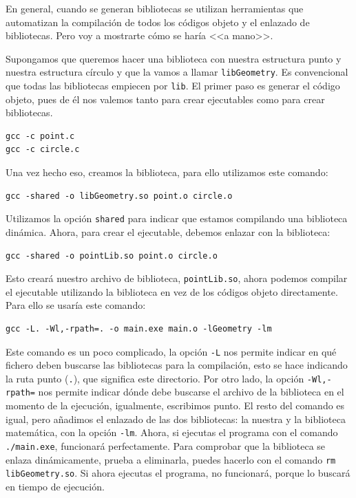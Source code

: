 \documentclass[a4paper]{article}
\begin{document}
En general, cuando se generan bibliotecas se utilizan herramientas que
automatizan la compilación de todos los códigos objeto y el enlazado de
bibliotecas. Pero voy a mostrarte cómo se haría <<a mano>>.

Supongamos que queremos hacer una biblioteca con nuestra estructura punto y
nuestra estructura círculo y que la vamos a llamar \verb!libGeometry!.
Es convencional que todas las bibliotecas empiecen por \verb!lib!.
El primer paso es generar el código objeto,
pues de él nos valemos tanto para crear ejecutables como para crear bibliotecas.
\begin{verbatim}
gcc -c point.c
gcc -c circle.c
\end{verbatim}

Una vez hecho eso, creamos la biblioteca, para ello utilizamos este comando:
\begin{verbatim}
gcc -shared -o libGeometry.so point.o circle.o
\end{verbatim}

Utilizamos la opción \verb!shared! para indicar que estamos compilando
una biblioteca dinámica. Ahora, para crear el ejecutable, debemos enlazar con
la biblioteca:

\begin{verbatim}
gcc -shared -o pointLib.so point.o circle.o
\end{verbatim}

Esto creará nuestro archivo de biblioteca, \verb!pointLib.so!, ahora podemos
compilar el ejecutable utilizando la biblioteca en vez de los códigos objeto
directamente. Para ello se usaría este comando:

\begin{verbatim}
gcc -L. -Wl,-rpath=. -o main.exe main.o -lGeometry -lm
\end{verbatim}

Este comando es un poco complicado, la opción \verb!-L! nos permite indicar
en qué fichero deben buscarse las bibliotecas para la compilación, esto se hace
indicando la ruta punto (\verb!.!), que significa este directorio. Por otro
lado, la opción \verb!-Wl,-rpath=! nos permite indicar dónde debe buscarse
el archivo de la biblioteca en el momento de la ejecución,
igualmente, escribimos punto. El resto del
comando es igual, pero añadimos el enlazado de las dos bibliotecas: la nuestra y
la biblioteca matemática, con la opción \verb!-lm!. Ahora, si ejecutas el
programa con el comando \verb!./main.exe!, funcionará perfectamente.
Para comprobar que la biblioteca se enlaza dinámicamente, prueba a eliminarla,
puedes hacerlo con el comando \verb!rm libGeometry.so!. Si ahora ejecutas el
programa, no funcionará, porque lo buscará en tiempo de ejecución.
\end{document}
